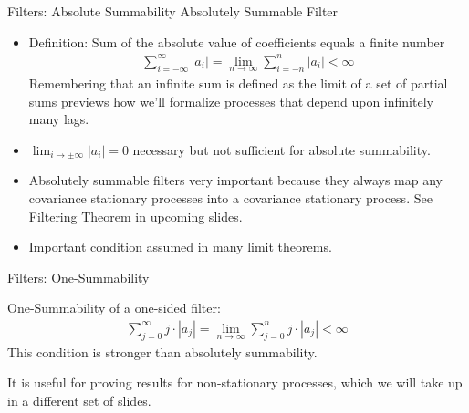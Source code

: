 \documentclass[aspectratio=169, handout]{beamer}
\newcommand{\ra}{\rightarrow}
\begin{document}
{\footnotesize
\begin{frame}{Filters: Absolute Summability}
\alert{Absolutely Summable Filter}
\begin{itemize}
  \item Definition: Sum of the absolute value of coefficients equals a
    finite number
    \begin{align*}
      \sum_{i=-\infty}^\infty |a_i|
      =
      \lim_{n\ra \infty}
      \sum_{i=-n}^n |a_i|
      < \infty
    \end{align*}
    Remembering that an infinite sum is defined as the limit of a set of
    partial sums previews how we'll formalize processes that depend upon
    infinitely many lags.

  \pause
  \item $\lim_{i\ra \pm \infty} |a_i| =0$ necessary but not sufficient
    for absolute summability.

  \pause
  \item Absolutely summable filters very important because they always
    map any covariance stationary processes into a covariance stationary
    process. See Filtering Theorem in upcoming slides.


  \item Important condition assumed in many limit theorems.
\end{itemize}
\end{frame}
}


{\footnotesize
\begin{frame}{Filters: One-Summability}

\alert{One-Summability} of a one-sided filter:
\begin{align*}
  \sum_{j=0}^\infty j \cdot |a_j|
  =
  \lim_{n\ra \infty}
  \sum_{j=0}^n j \cdot |a_j|
  < \infty
\end{align*}
This condition is \alert{stronger} than absolutely summability.

\pause
It is useful for proving results for \alert{non-stationary processes},
which we will take up in a different set of slides.
\end{frame}
}
\end{document}
